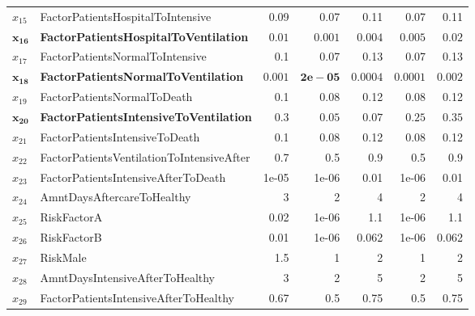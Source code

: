 \documentclass[conference]{IEEEtran}
\begin{document}
\begin{table}[ht]
\begin{tabular}{llrrrrr}
$x_{15}$&   FactorPatientsHospitalToIntensive & 0.09 & 0.07 & 0.11 & 0.07 & 0.11 \\ 
$ \mathbf{x_{16}}$ & \textbf{FactorPatientsHospitalToVentilation} & $ \mathbf{0.01}$ & $ \mathbf{0.001}$ & $ \mathbf{0.004} $& $ \mathbf{0.005}$ & $ \mathbf{0.02}$ \\ 
$x_{17}$&   FactorPatientsNormalToIntensive & 0.1 & 0.07 & 0.13 & 0.07 & 0.13 \\ 
$\mathbf{x_{18}}$&   \textbf{FactorPatientsNormalToVentilation} & $\mathbf{0.001}$ & $\mathbf{2e-05}$ & $\mathbf{0.0004}$ & $\mathbf{0.0001}$ & $\mathbf{ 0.002}$ \\ 
$x_{19}$&   FactorPatientsNormalToDeath & 0.1 & 0.08 & 0.12 & 0.08 & 0.12 \\ 
$\mathbf{x_{20}}$&   \textbf{FactorPatientsIntensiveToVentilation} & $\mathbf{0.3}$ & $\mathbf{0.05}$ & $\mathbf{0.07}$ & $\mathbf{0.25}$ & $\mathbf{0.35}$ \\ 
$x_{21}$&   FactorPatientsIntensiveToDeath & 0.1 & 0.08 & 0.12 & 0.08 & 0.12 \\  
$x_{22}$&   FactorPatientsVentilationToIntensiveAfter & 0.7 & 0.5 & 0.9 & 0.5 & 0.9 \\ 
$x_{23}$&   FactorPatientsIntensiveAfterToDeath & 1e-05 & 1e-06 & 0.01 & 1e-06 & 0.01 \\ 
$x_{24}$&   AmntDaysAftercareToHealthy &   3 &   2 &   4 &   2 &   4 \\ 
$x_{25}$&   RiskFactorA & 0.02 & 1e-06 & 1.1 & 1e-06 & 1.1 \\
$x_{26}$&   RiskFactorB & 0.01 & 1e-06 & 0.062 & 1e-06 & 0.062 \\ 
$x_{27}$&   RiskMale & 1.5 &   1 &   2 &   1 &   2 \\  
$x_{28}$&   AmntDaysIntensiveAfterToHealthy &   3 &   2 &   5 &   2 &   5 \\ 
$x_{29}$&   FactorPatientsIntensiveAfterToHealthy & 0.67 & 0.5 & 0.75 & 0.5 & 0.75 \\ 
   \hline
\end{tabular}
\end{table}
\end{document}
